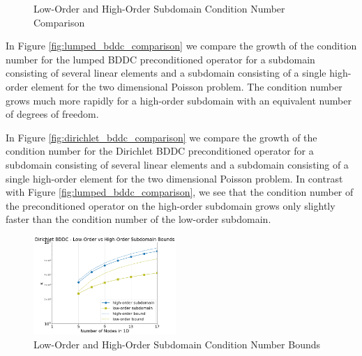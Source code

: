 \begin{figure}[!ht]
  \centering
  \hfill
  \caption{Low-Order and High-Order Subdomain Condition Number Comparison}
\end{figure}

In Figure \ref{fig:lumped_bddc_comparison} we compare the growth of the condition number for the lumped BDDC preconditioned operator for a subdomain consisting of several linear elements and a subdomain consisting of a single high-order element for the two dimensional Poisson problem.
The condition number grows much more rapidly for a high-order subdomain with an equivalent number of degrees of freedom.

In Figure \ref{fig:dirichlet_bddc_comparison} we compare the growth of the condition number for the Dirichlet BDDC preconditioned operator for a subdomain consisting of several linear elements and a subdomain consisting of a single high-order element for the two dimensional Poisson problem.
In contrast with Figure \ref{fig:lumped_bddc_comparison}, we see that the condition number of the preconditioned operator on the high-order subdomain grows only slightly faster than the condition number of the low-order subdomain.

\begin{figure}[!ht]
  \centering\includegraphics[width=0.48\textwidth]{../img/lowVsHighDirichletBounds}
  \caption{Low-Order and High-Order Subdomain Condition Number Bounds}
  \label{fig:dirichlet_bddc_bounds}
\end{figure}

